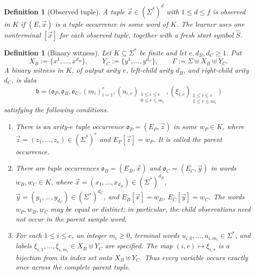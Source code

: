 \documentclass[11pt,a4paper]{article}
\newtheorem{definition}[theorem]{Definition}
\theoremstyle{remark}
\newcommand{\tuple}[1]{\vec{#1}}
\begin{document}
\begin{definition}[Observed tuple]
\label{def:observed-tuple}
A tuple \(\tuple x\in(\Sigma^*)^d\) with \(1\le d\le f\) is \emph{observed in
\(K\)} if \((E,\tuple x)\) is a tuple occurrence in some word of \(K\).  The
learner uses one nonterminal \([\tuple x]\) for each observed tuple, together
with a fresh start symbol \(\widehat S\).
\end{definition}

\begin{definition}[Binary witness]
\label{def:binary-witness}
Let \(K\subseteq\Sigma^*\) be finite and let \(e,d_B,d_C\ge1\).  Put
\[
  X_B:=\{x^1,\ldots,x^{d_B}\},\qquad
  Y_C:=\{y^1,\ldots,y^{d_C}\},\qquad
  \Gamma:=\Sigma\uplus X_B\uplus Y_C.
\]
A \emph{binary witness} in \(K\), of output arity \(e\), left-child arity
\(d_B\), and right-child arity \(d_C\), is data
\[
  \mathfrak b=\bigl(
    \mathfrak o_P,\mathfrak o_B,\mathfrak o_C,(m_i)_{i=1}^e,
    (u_{i,r})_{\substack{1\le i\le e\\0\le r\le m_i}},
    (\xi_{i,r})_{\substack{1\le i\le e\\1\le r\le m_i}}
  \bigr)
\]
satisfying the following conditions.
\begin{enumerate}[label=(\roman*),leftmargin=*]
\item There is an arity-\(e\) tuple occurrence
      \(\mathfrak o_P=(E_P,\tuple z)\) in some \(w_P\in K\), where
      \(\tuple z=(z_1,\ldots,z_e)\in(\Sigma^*)^e\) and
      \(E_P[\tuple z]=w_P\).  It is called the \emph{parent occurrence}.

\item There are tuple occurrences
      \(\mathfrak o_B=(E_B,\tuple x)\) and
      \(\mathfrak o_C=(E_C,\tuple y)\) in words \(w_B,w_C\in K\), where
      \(\tuple x=(x_1,\ldots,x_{d_B})\in(\Sigma^*)^{d_B}\),
      \(\tuple y=(y_1,\ldots,y_{d_C})\in(\Sigma^*)^{d_C}\), and
      \(E_B[\tuple x]=w_B\), \(E_C[\tuple y]=w_C\).  The words
      \(w_P,w_B,w_C\) may be equal or distinct; in particular, the child
      observations need not occur in the parent sample word.

\item For each \(1\le i\le e\), an integer \(m_i\ge0\), terminal words
      \(u_{i,0},\ldots,u_{i,m_i}\in\Sigma^*\), and labels
      \(\xi_{i,1},\ldots,\xi_{i,m_i}\in X_B\uplus Y_C\) are specified.
      The map \((i,r)\mapsto\xi_{i,r}\) is a bijection from its index set
      onto \(X_B\uplus Y_C\).  Thus every variable occurs exactly once across
      the complete parent tuple.


\end{enumerate}
\end{definition}
\end{document}

